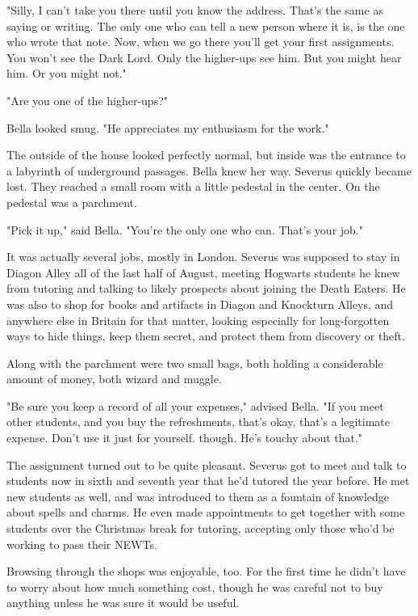 "Silly, I can't take you there until you know the address. That's the same as saying or writing. The only one who can tell a new person where it is, is the one who wrote that note. Now, when we go there you'll get your first assignments. You won't see the Dark Lord. Only the higher-ups see him. But you might hear him. Or you might not."

"Are you one of the higher-ups?"

Bella looked smug. "He appreciates my enthusiasm for the work."

The outside of the house looked perfectly normal, but inside was the entrance to a labyrinth of underground passages. Bella knew her way. Severus quickly became lost. They reached a small room with a little pedestal in the center. On the pedestal was a parchment.

"Pick it up," said Bella. "You're the only one who can. That's your job."

It was actually several jobs, mostly in London. Severus was supposed to stay in Diagon Alley all of the last half of August, meeting Hogwarts students he knew from tutoring and talking to likely prospects about joining the Death Eaters. He was also to shop for books and artifacts in Diagon and Knockturn Alleys, and anywhere else in Britain for that matter, looking especially for long-forgotten ways to hide things, keep them secret, and protect them from discovery or theft.

Along with the parchment were two small bags, both holding a considerable amount of money, both wizard and muggle.

"Be sure you keep a record of all your expenses," advised Bella. "If you meet other students, and you buy the refreshments, that's okay, that's a legitimate expense. Don't use it just for yourself. though. He's touchy about that."

The assignment turned out to be quite pleasant. Severus got to meet and talk to students now in sixth and seventh year that he'd tutored the year before. He met new students as well, and was introduced to them as a fountain of knowledge about spells and charms. He even made appointments to get together with some students over the Christmas break for tutoring, accepting only those who'd be working to pass their NEWTs.

Browsing through the shops was enjoyable, too. For the first time he didn't have to worry about how much something cost, though he was careful not to buy anything unless he was sure it would be useful.

